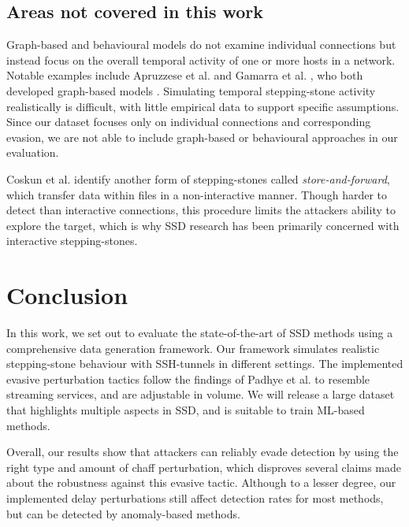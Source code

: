 \documentclass[runningheads,11pt]{llncs}\usepackage[]{graphicx}\usepackage[]{color}
\begin{document}




\subsection{Areas not covered in this work}

Graph-based and behavioural models do not examine individual connections but instead focus on the overall temporal activity of one or more hosts in a network. 
Notable examples include Apruzzese et al. \cite{apruzzese2017detection} and Gamarra et al. \cite{gamarra2018analysis}, who both developed graph-based models .
Simulating temporal stepping-stone activity realistically is difficult, with little empirical data to support specific assumptions. Since our dataset focuses only on individual connections and corresponding evasion, we are not able to include graph-based or behavioural approaches in our evaluation.

Coskun et al. \cite{coskun2007efficient} identify another form of stepping-stones called \textit{store-and-forward}, which transfer data within files in a non-interactive manner. Though harder to detect than interactive connections, this procedure limits the attackers ability to explore the target, which is why SSD research has been primarily concerned with interactive stepping-stones.


\section{Conclusion}

In this work, we set out to evaluate the state-of-the-art of SSD methods using a comprehensive data generation framework. Our framework simulates realistic stepping-stone behaviour with SSH-tunnels in different  settings. The implemented evasive perturbation tactics follow the findings of Padhye et al. \cite{padhye2010evading} to resemble streaming services, and are adjustable in volume. We will release a large dataset that highlights multiple aspects in SSD, and is suitable to train ML-based methods. 

Overall, our results show that attackers can reliably evade detection by using the right type and amount of chaff perturbation, which disproves several claims made about the robustness against this evasive tactic. Although to a lesser degree, our implemented delay perturbations still affect detection rates for most methods, but can be detected by anomaly-based methods. 
\end{document}
